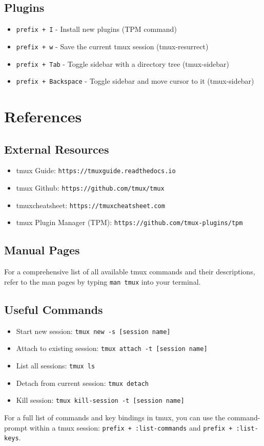 \documentclass{article}
\begin{document}
\subsection{Plugins}
\begin{itemize}
  \item \texttt{prefix + I} - Install new plugins (TPM command)
  \item \texttt{prefix + w} - Save the current tmux session (tmux-resurrect)
  \item \texttt{prefix + Tab} - Toggle sidebar with a directory tree (tmux-sidebar)
  \item \texttt{prefix + Backspace} - Toggle sidebar and move cursor to it (tmux-sidebar)
\end{itemize}

\section{References}
\subsection{External Resources}
\begin{itemize}
  \item tmux Guide: \texttt{https://tmuxguide.readthedocs.io}
  \item tmux Github: \texttt{https://github.com/tmux/tmux}
  \item tmuxcheatsheet: \texttt{https://tmuxcheatsheet.com}
  \item tmux Plugin Manager (TPM): \texttt{https://github.com/tmux-plugins/tpm}
\end{itemize}

\subsection{Manual Pages}
For a comprehensive list of all available tmux commands and their 
descriptions, refer to the man pages by typing \texttt{man tmux} into 
your terminal.

\subsection{Useful Commands}
\begin{itemize}
  \item Start new session: \texttt{tmux new -s [session name]}
  \item Attach to existing session: \texttt{tmux attach -t [session name]}
  \item List all sessions: \texttt{tmux ls}
  \item Detach from current session: \texttt{tmux detach}
  \item Kill session: \texttt{tmux kill-session -t [session name]}
\end{itemize}

For a full list of commands and key bindings in tmux, you can use the 
command-prompt within a tmux session: \texttt{prefix + :list-commands} 
and \texttt{prefix + :list-keys}.
\end{document}

